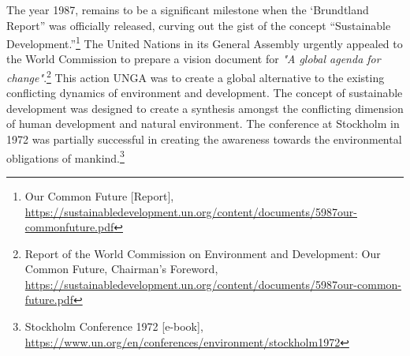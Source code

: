 \setcounter{figure}{0}
\setcounter{table}{0}
\setcounter{footnote}{0}




\begin{multicols}{2}


\noi
The year 1987, remains to be a significant milestone when the ‘Brundtland Report” was
officially released, curving out the gist of the concept “Sustainable Development.”\footnote{Our Common Future [Report], \url{https://sustainabledevelopment.un.org/content/documents/5987our-commonfuture.pdf}}
 The
United Nations in its General Assembly urgently appealed to the World Commission to
prepare a vision document for \textit{"A global agenda for change"}.\footnote{Report of the World Commission on Environment and Development: Our Common Future, Chairman’s Foreword, \url{https://sustainabledevelopment.un.org/content/documents/5987our-common-future.pdf}}
 This action UNGA was to
create a global alternative to the existing conflicting dynamics of environment and
development. The concept of sustainable development was designed to create a synthesis
amongst the conflicting dimension of human development and natural environment. The
conference at Stockholm in 1972 was partially successful in creating the awareness towards
the environmental obligations of mankind.\footnote{Stockholm Conference 1972 [e-book], \url{https://www.un.org/en/conferences/environment/stockholm1972}}


\end{multicols}
